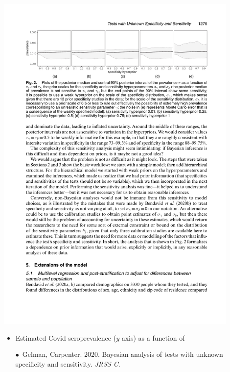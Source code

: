 \documentclass[10pt]{report}
\begin{document}
\begin{center}
\vspace*{-10pt}
\includegraphics[width=0.9\textwidth]{img/covid-sensitivity.pdf}
\vspace*{-10pt}
\end{center}
\begin{itemize}
\item Estimated Covid seroprevalence ($y$ axis) as a function of
\vfill
{\footnotesize $\bullet$\
Gelman, Carpenter. 2020. Bayesian analysis of tests with unknown
specificity and sensitivity. \textit{JRSS C}.}
\end{itemize}
\end{document}
